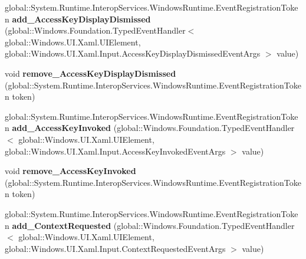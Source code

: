 \begin{DoxyCompactItemize}
\item 
\mbox{\label{interface_windows_1_1_u_i_1_1_xaml_1_1_i_u_i_element4_a9d51d9f59f40a6fabc504798338e3514}} 
global\+::\+System.\+Runtime.\+Interop\+Services.\+Windows\+Runtime.\+Event\+Registration\+Token {\bfseries add\+\_\+\+Access\+Key\+Display\+Dismissed} (global\+::\+Windows.\+Foundation.\+Typed\+Event\+Handler$<$ global\+::\+Windows.\+U\+I.\+Xaml.\+U\+I\+Element, global\+::\+Windows.\+U\+I.\+Xaml.\+Input.\+Access\+Key\+Display\+Dismissed\+Event\+Args $>$ value)
\item 
\mbox{\label{interface_windows_1_1_u_i_1_1_xaml_1_1_i_u_i_element4_a3571804f8a98025c430544d76cfc6f74}} 
void {\bfseries remove\+\_\+\+Access\+Key\+Display\+Dismissed} (global\+::\+System.\+Runtime.\+Interop\+Services.\+Windows\+Runtime.\+Event\+Registration\+Token token)
\item 
\mbox{\label{interface_windows_1_1_u_i_1_1_xaml_1_1_i_u_i_element4_abbf41cd69a2641b693ab19a02690a325}} 
global\+::\+System.\+Runtime.\+Interop\+Services.\+Windows\+Runtime.\+Event\+Registration\+Token {\bfseries add\+\_\+\+Access\+Key\+Invoked} (global\+::\+Windows.\+Foundation.\+Typed\+Event\+Handler$<$ global\+::\+Windows.\+U\+I.\+Xaml.\+U\+I\+Element, global\+::\+Windows.\+U\+I.\+Xaml.\+Input.\+Access\+Key\+Invoked\+Event\+Args $>$ value)
\item 
\mbox{\label{interface_windows_1_1_u_i_1_1_xaml_1_1_i_u_i_element4_ae34bf72d8d0d7a9d33ede980ae1b29db}} 
void {\bfseries remove\+\_\+\+Access\+Key\+Invoked} (global\+::\+System.\+Runtime.\+Interop\+Services.\+Windows\+Runtime.\+Event\+Registration\+Token token)
\item 
\mbox{\label{interface_windows_1_1_u_i_1_1_xaml_1_1_i_u_i_element4_abe904f042597f814b0e82b6911018524}} 
global\+::\+System.\+Runtime.\+Interop\+Services.\+Windows\+Runtime.\+Event\+Registration\+Token {\bfseries add\+\_\+\+Context\+Requested} (global\+::\+Windows.\+Foundation.\+Typed\+Event\+Handler$<$ global\+::\+Windows.\+U\+I.\+Xaml.\+U\+I\+Element, global\+::\+Windows.\+U\+I.\+Xaml.\+Input.\+Context\+Requested\+Event\+Args $>$ value)

\end{DoxyCompactItemize}
